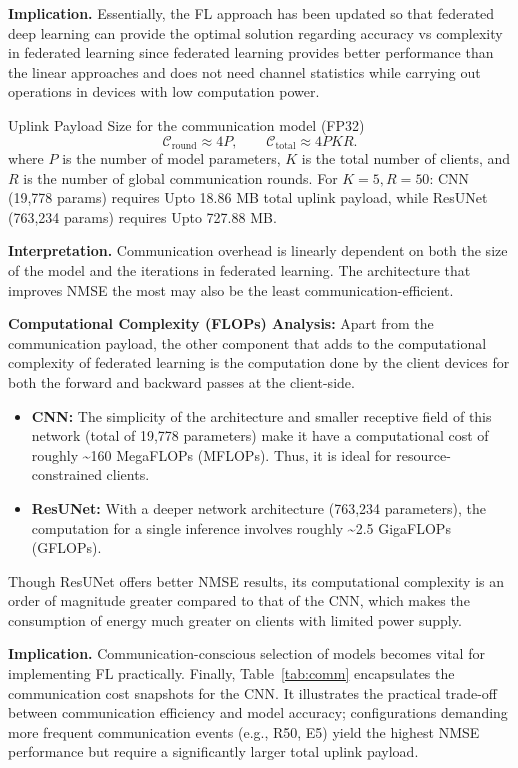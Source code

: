 \documentclass[runningheads]{llncs}
\begin{document}
\noindent\textbf{Implication.} Essentially, the FL approach has been updated so that federated deep learning can provide the optimal solution regarding accuracy vs complexity in federated learning since federated learning provides better performance than the linear approaches and does not need channel statistics while carrying out operations in devices with low computation power.

Uplink Payload Size for the communication model (FP32)
\begin{equation}
\mathcal{C}_{\text{round}}\approx 4P,\qquad
\mathcal{C}_{\text{total}}\approx 4PKR.
\end{equation}
where $P$ is the number of model parameters, $K$ is the total number of clients, and $R$ is the number of global communication rounds.
For $K{=}5, R{=}50$: CNN (19,778 params) requires Upto 18.86 MB total uplink payload, while ResUNet (763,234 params) requires Upto 727.88 MB.

\noindent\textbf{Interpretation.} Communication overhead is linearly dependent on both the size of the model and the iterations in federated learning. The architecture that improves NMSE the most may also be the least communication-efficient.

\textbf{Computational Complexity (FLOPs) Analysis:} Apart from the communication payload, the other component that adds to the computational complexity of federated learning is the computation done by the client devices for both the forward and backward passes at the client-side.
\begin{itemize}
    \item \textbf{CNN:} The simplicity of the architecture and smaller receptive field of this network (total of 19,778 parameters) make it have a computational cost of roughly \textasciitilde 160 MegaFLOPs (MFLOPs). Thus, it is ideal for resource-constrained clients. 
    \item \textbf{ResUNet:} With a deeper network architecture (763,234 parameters), the
computation for a single inference involves roughly \textasciitilde 2.5 GigaFLOPs (GFLOPs).
\end{itemize}
Though ResUNet offers better NMSE results, its computational complexity is an order of magnitude greater compared to that of the CNN, which makes the consumption of energy much greater on clients with limited power supply.

\noindent\textbf{Implication.} Communication-conscious selection of models becomes vital for implementing FL practically. Finally, Table~\ref{tab:comm} encapsulates the communication cost snapshots for the CNN. It illustrates the practical trade-off between communication efficiency and model accuracy; configurations demanding more frequent communication events (e.g., R50, E5) yield the highest NMSE performance but require a significantly larger total uplink payload.
\end{document}
